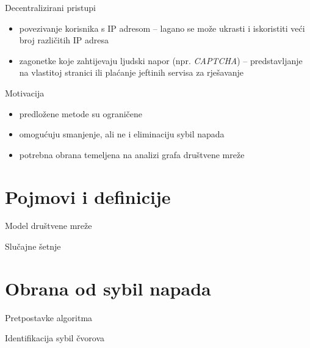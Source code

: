 \documentclass{beamer}
\begin{document}
\begin{frame}{Decentralizirani pristupi}
  \begin{itemize}
    \item povezivanje korisnika s IP adresom -- lagano se može ukrasti i iskoristiti veći broj različitih IP adresa
    \item zagonetke koje zahtijevaju ljudski napor (npr. \textit{CAPTCHA}) -- predstavljanje na vlastitoj stranici ili plaćanje jeftinih servisa za rješavanje
  \end{itemize}
\end{frame}

\begin{frame}{Motivacija}
  \begin{itemize}
    \item predložene metode su ograničene
    \item omogućuju smanjenje, ali ne i eliminaciju sybil napada
    \item potrebna obrana temeljena na analizi grafa društvene mreže
  \end{itemize}
\end{frame}

\section{Pojmovi i definicije}

\begin{frame}{Model društvene mreže}
  \begin{itemize}
  \end{itemize}
\end{frame}

\begin{frame}{Slučajne šetnje}
  \begin{itemize}
  \end{itemize}
\end{frame}

\section{Obrana od sybil napada}

\begin{frame}{Pretpostavke algoritma}
  \begin{itemize}
  \end{itemize}
\end{frame}

\begin{frame}{Identifikacija sybil čvorova}
  \begin{itemize}
  \end{itemize}
\end{frame}
\end{document}
